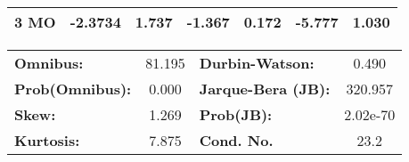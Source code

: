 \begin{center}
\begin{tabular}{lcccccc}
\textbf{3 MO}      &      -2.3734  &        1.737     &    -1.367  &         0.172        &       -5.777    &        1.030     \\
\bottomrule
\end{tabular}
\begin{tabular}{lclc}
\textbf{Omnibus:}       & 81.195 & \textbf{  Durbin-Watson:     } &    0.490  \\
\textbf{Prob(Omnibus):} &  0.000 & \textbf{  Jarque-Bera (JB):  } &  320.957  \\
\textbf{Skew:}          &  1.269 & \textbf{  Prob(JB):          } & 2.02e-70  \\
\textbf{Kurtosis:}      &  7.875 & \textbf{  Cond. No.          } &     23.2  \\
\bottomrule
\end{tabular}
\end{center}

